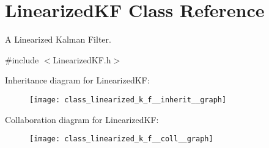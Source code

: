 \hypertarget{class_linearized_k_f}{\section{\-Linearized\-K\-F \-Class \-Reference}
\label{class_linearized_k_f}
}


\-A \-Linearized \-Kalman \-Filter.  




{\ttfamily \#include $<$\-Linearized\-K\-F.\-h$>$}



\-Inheritance diagram for \-Linearized\-K\-F\-:
\nopagebreak
\begin{figure}[H]
\begin{center}
\leavevmode
\texttt{[image: class\_linearized\_k\_f\_\_inherit\_\_graph]}
\end{center}
\end{figure}


\-Collaboration diagram for \-Linearized\-K\-F\-:
\nopagebreak
\begin{figure}[H]
\begin{center}
\leavevmode
\texttt{[image: class\_linearized\_k\_f\_\_coll\_\_graph]}
\end{center}
\end{figure}
